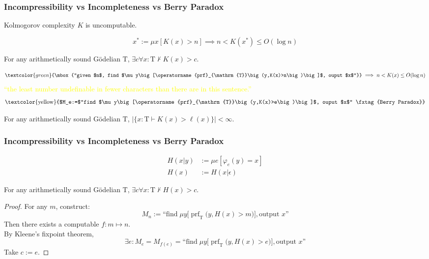 \documentclass[UTF8,aspectratio=43,11pt,colorlinks,compress,openany]{beamer}%
\begin{document}
\begin{frame}\frametitle{Incompressibility vs Incompleteness vs Berry Paradox}
	\begin{theorem}[Kolmogorov]
		Kolmogorov complexity $K$ is uncomputable.
	\end{theorem}\vspace{-11pt}
	\[x^*:=\mu x[K(x)>n]\implies n<K(x^*)\leq O(\log n)\]
	\begin{theorem}[Chaitin]
		For any arithmetically sound G\"odelian $\mathrm{T}$, $\exists c\forall x: \mathrm{T}\nvdash K(x)>c$.
	\end{theorem}\vspace{-17pt}
	\[\textcolor{green}{\mbox{``given $n$, find $\mu y\big[\operatorname{prf}_{\mathrm{T}}\big(y,K(x)>n\big)\big]$, ouput $x$''}}\implies n<K(x)\leq O(\log n)\]
	{\centering\small \textcolor{yellow}{``the least number undefinable in fewer characters than there are in this sentence.''}}
	\[\mbox{\textcolor{yellow}{$M_e:=$``find $\mu y\big[\operatorname{prf}_{\mathrm{T}}\big(y,K(x)>e\big)\big]$, ouput $x$'' \tag{Berry Paradox}}}\]
	\begin{theorem}[Chaitin]
		For any arithmetically sound G\"odelian $\mathrm{T}$, $\big|\big\{x: \mathrm{T}\vdash K(x)>\ell(x)\big\}\big|<\infty$.
	\end{theorem}
\end{frame}

\begin{frame}\frametitle{Incompressibility vs Incompleteness vs Berry Paradox}
\setlength\abovedisplayskip{0pt}
\setlength\belowdisplayskip{0pt}
	\begin{definition}
		\begin{align*}
		H(x|y)&:=\mu e[\varphi_e(y)=x]\\
		H(x)&:=H(x|\epsilon)
		\end{align*}
	\end{definition}
	\begin{theorem}[Chaitin]
		For any arithmetically sound G\"odelian $\mathrm{T}$, $\exists c\forall x: \mathrm{T}\nvdash H(x)>c$.
	\end{theorem}
	\begin{proof}
		For any $m$, construct:
		\[M_n:=\text{``find}\;\mu y\big[\operatorname{prf}_{\mathrm{T}}\big(y,H(x)>m\big)\big], \text{output $x$''}\]
		Then there exists a computable $f: m\mapsto n$.\\
		By Kleene's fixpoint theorem,
		\[\exists e: M_e=M_{f(e)}=\text{``find}\;\mu y\big[\operatorname{prf}_{\mathrm{T}}\big(y,H(x)>e\big)\big], \text{output $x$''}\]
		Take $c:=e$.
	\end{proof}
\end{frame}
\end{document}

